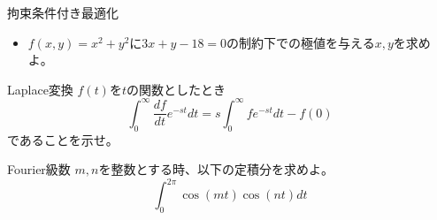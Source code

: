 \begin{slide}{拘束条件付き最適化}
\begin{itemize}
\item $f(x,y) = x^2 + y^2$に$3x+y-18=0$の制約下での極値を与える$x,y$を求めよ。
\end{itemize}
\end{slide}

\begin{slide}{Laplace変換}
$f(t)$を$t$の関数としたとき
\begin{equation}
\int_0^{\infty} \frac{df}{dt} e^{-st} dt = s \int_0^{\infty} f e^{-st} dt - f(0)
\end{equation}
であることを示せ。

\end{slide}
 \begin{slide}{Fourier級数}
$m, n$を整数とする時、以下の定積分を求めよ。
\begin{equation}
\int_0^{2\pi} \cos(mt)\cos(nt) dt
\end{equation}

\end{slide}